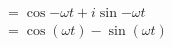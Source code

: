 \documentclass[preview]{standalone}
\begin{document}
\begin{align*}
=\cos{-\omega t}+i\sin{-\omega t} \\ = \cos{(\omega t)}-\sin{(\omega t)}
\end{align*}
\end{document}
